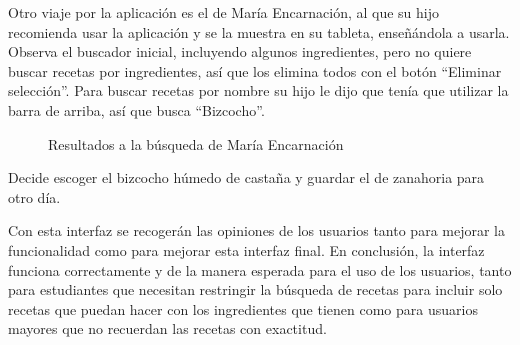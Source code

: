 Otro viaje por la aplicación es el de María Encarnación, al que su hijo recomienda usar la aplicación y se la muestra en su tableta, enseñándola a usarla. Observa el buscador inicial, incluyendo algunos ingredientes, pero no quiere buscar recetas por ingredientes, así que los elimina todos con el botón ``Eliminar selección''. Para buscar recetas por nombre su hijo le dijo que tenía que utilizar la barra de arriba, así que busca ``Bizcocho''. 

\begin{figure}[H]
    \caption{Resultados a la búsqueda de María Encarnación}
    \label{fig:Daniel-pasos2}
\end{figure}

Decide escoger el bizcocho húmedo de castaña y guardar el de zanahoria para otro día.

Con esta interfaz se recogerán las opiniones de los usuarios tanto para mejorar la funcionalidad como para mejorar esta interfaz final. En conclusión, la \gls{interfaz} funciona correctamente y de la manera esperada para el uso de los usuarios, tanto para estudiantes que necesitan restringir la búsqueda de recetas para incluir solo recetas que puedan hacer con los ingredientes que tienen como para usuarios mayores que no recuerdan las recetas con exactitud.

